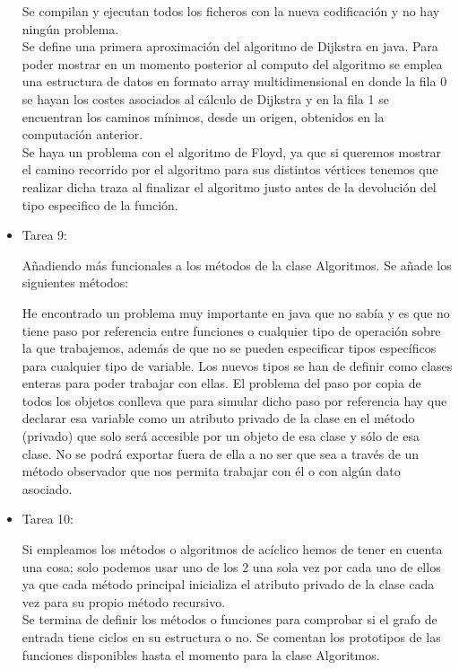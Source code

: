 \begin{itemize}
Se compilan y ejecutan todos los ficheros con la nueva codificación y no hay ningún problema.\\

Se define una primera aproximación del algoritmo de Dijkstra en java. Para poder mostrar en un momento posterior al computo del algoritmo se emplea una estructura de datos en formato array multidimensional en donde la fila 0 se hayan los costes asociados al cálculo de Dijkstra y en la fila 1 se encuentran los caminos mínimos, desde un origen, obtenidos en la computación anterior.\\

Se haya un problema con el algoritmo de Floyd, ya que si queremos mostrar el camino recorrido por el algoritmo para sus distintos vértices tenemos que realizar dicha traza al finalizar el algoritmo justo antes de la devolución del tipo especifico de la función.\\

\item Tarea 9:

Añadiendo más funcionales a los métodos de la clase Algoritmos. Se añade los siguientes métodos:



He encontrado un problema muy importante en java que no sabía y es que no tiene paso por referencia entre funciones o cualquier tipo de operación sobre la que trabajemos, además de que no se pueden especificar tipos específicos para cualquier tipo de variable. Los nuevos tipos se han de definir como clases enteras para poder trabajar con ellas. El problema del paso por copia de todos los objetos conlleva que para simular dicho paso por referencia hay que declarar esa variable como un atributo privado de la clase en el método (privado) que solo será accesible por un objeto de esa clase y sólo de esa clase. No se podrá exportar fuera de ella a no ser que sea a través de un método observador que nos permita trabajar con él o con algún dato asociado.\\

\item Tarea 10:

Si empleamos los métodos o algoritmos de acíclico hemos de tener en cuenta una cosa; solo podemos usar uno de los 2 una sola vez por cada uno de ellos ya que cada método principal inicializa el atributo privado de la clase cada vez para su propio método recursivo.\\

Se termina de definir los métodos o funciones para comprobar si el grafo de entrada tiene ciclos en su estructura o no. Se comentan los prototipos de las funciones disponibles hasta el momento para la clase Algoritmos.\\


\end{itemize}
